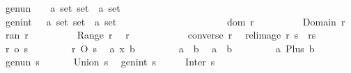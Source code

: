 \begin{isabellebody}
\ \ gen{\isacharunderscore}un\ \ \ \ {\isacharcolon}{\isacharcolon}{\isachardoublequoteopen}{\isacharprime}a\ set\ set\ {\isacharequal}{\isachargreater}\ {\isacharprime}a\ set{\isachardoublequoteclose}\ \ \ \ \ \ \ \ \ \ \ \ \ \ \ \ \ \ \ {\isacharparenleft}{\isachardoublequoteopen}{\isasymbigcup}\ {\isacharunderscore}{\isachardoublequoteclose}{\isacharparenright}\isanewline
\ \ gen{\isacharunderscore}int\ \ \ {\isacharcolon}{\isacharcolon}{\isachardoublequoteopen}{\isacharprime}a\ set\ set\ {\isacharequal}{\isachargreater}\ {\isacharprime}a\ set{\isachardoublequoteclose}\ \ \ \ \ \ \ \ \ \ \ \ \ \ \ \ \ \ \ {\isacharparenleft}{\isachardoublequoteopen}{\isasymbigcap}\ {\isacharunderscore}{\isachardoublequoteclose}{\isacharparenright}\isanewline
\isanewline
\isanewline
{}\isamarkupfalse%
\isanewline
\ \ {\isachardoublequoteopen}dom\ r{\isachardoublequoteclose}\ \ \ \ \ \ \ \ \ {\isacharequal}{\isacharequal}\ {\isachardoublequoteopen}Domain\ r{\isachardoublequoteclose}\isanewline
\ \ {\isachardoublequoteopen}ran\ r{\isachardoublequoteclose}\ \ \ \ \ \ \ \ \ {\isacharequal}{\isacharequal}\ {\isachardoublequoteopen}Range\ r{\isachardoublequoteclose}\isanewline
\ \ {\isachardoublequoteopen}r\ {\isacharpercent}{\isachartilde}{\isachardoublequoteclose}\ \ \ \ \ \ \ \ \ \ {\isacharequal}{\isacharequal}\ {\isachardoublequoteopen}converse\ r{\isachardoublequoteclose}\isanewline
\ \ {\isachardoublequoteopen}rel{\isacharunderscore}image\ r\ s{\isachardoublequoteclose}\ {\isacharequal}{\isacharequal}\ {\isachardoublequoteopen}r{\isacharbackquote}{\isacharbackquote}s{\isachardoublequoteclose}\isanewline
\ \ {\isachardoublequoteopen}r\ {\isacharpercent}o\ s{\isachardoublequoteclose}\ \ \ \ \ \ \ \ {\isacharequal}{\isacharequal}\ {\isachardoublequoteopen}r\ O\ s{\isachardoublequoteclose}\isanewline
\ \ {\isachardoublequoteopen}a\ {\isacharpercent}x\ b{\isachardoublequoteclose}\ \ \ \ \ \ \ \ {\isacharequal}{\isacharequal}\ {\isachardoublequoteopen}a\ {\isacharless}{\isacharasterisk}{\isachargreater}\ b{\isachardoublequoteclose}\isanewline
\ \ {\isachardoublequoteopen}a\ {\isacharpercent}{\isacharplus}\ b{\isachardoublequoteclose}\ \ \ \ \ \ \ \ {\isacharequal}{\isacharequal}\ {\isachardoublequoteopen}a\ Plus\ b{\isachardoublequoteclose}\isanewline
\ \ {\isachardoublequoteopen}gen{\isacharunderscore}un\ s{\isachardoublequoteclose}\ \ \ \ \ \ {\isacharequal}{\isacharequal}\ {\isachardoublequoteopen}Union\ s{\isachardoublequoteclose}\isanewline
\ \ {\isachardoublequoteopen}gen{\isacharunderscore}int\ s{\isachardoublequoteclose}\ \ \ \ \ {\isacharequal}{\isacharequal}\ {\isachardoublequoteopen}Inter\ s{\isachardoublequoteclose}\isanewline

\end{isabellebody}
